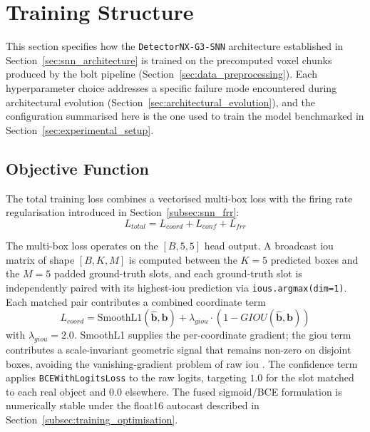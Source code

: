 \section{Training Structure}
\label{sec:training_structure}

This section specifies how the \texttt{DetectorNX-G3-SNN} architecture established in Section~\ref{sec:snn_architecture} is trained on the precomputed voxel chunks produced by the \gls{bolt} pipeline (Section~\ref{sec:data_preprocessing}).
Each hyperparameter choice addresses a specific failure mode encountered during architectural evolution (Section~\ref{sec:architectural_evolution}), and the configuration summarised here is the one used to train the model benchmarked in Section~\ref{sec:experimental_setup}.

\subsection{Objective Function}
\label{subsec:training_objective}

The total training loss combines a vectorised multi-box loss with the firing rate regularisation introduced in Section~\ref{subsec:snn_frr}:
\begin{equation}
    L_{total} = L_{coord} + L_{conf} + L_{frr}
    \label{eq:total_loss}
\end{equation}

The multi-box loss operates on the $[B, 5, 5]$ head output. A broadcast \gls{iou} matrix of shape $[B, K, M]$ is computed between the $K = 5$ predicted boxes and the $M = 5$ padded ground-truth slots, and each ground-truth slot is independently paired with its highest-\gls{iou} prediction via \texttt{ious.argmax(dim=1)}. Each matched pair contributes a combined coordinate term
\begin{equation}
    L_{coord} = \text{SmoothL1}(\hat{\mathbf{b}}, \mathbf{b}) + \lambda_{giou} \cdot (1 - GIOU(\hat{\mathbf{b}}, \mathbf{b}))
    \label{eq:coord_loss}
\end{equation}
with $\lambda_{giou} = 2.0$. SmoothL1 supplies the per-coordinate gradient; the \gls{giou} term contributes a scale-invariant geometric signal that remains non-zero on disjoint boxes, avoiding the vanishing-gradient problem of raw \gls{iou} \cite{rezatofighi2019giou}. The confidence term applies \texttt{BCEWithLogitsLoss} to the raw logits, targeting $1.0$ for the slot matched to each real object and $0.0$ elsewhere. The fused sigmoid/BCE formulation is numerically stable under the float16 autocast described in Section~\ref{subsec:training_optimisation}.

